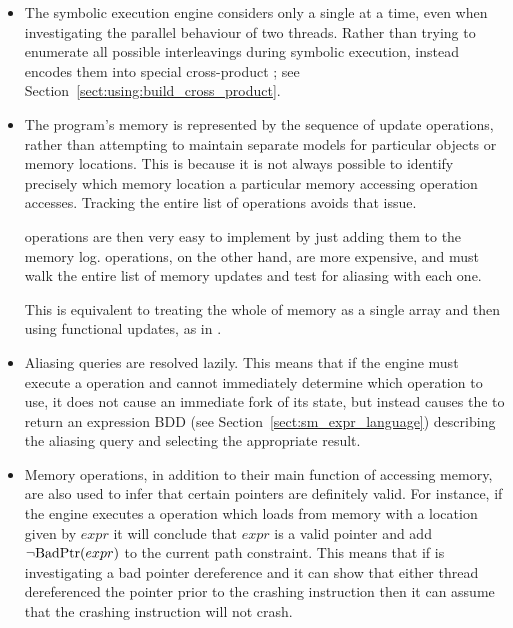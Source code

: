 \begin{itemize}
\item The symbolic execution engine considers only a single
  {\StateMachine} at a time, even when investigating the parallel
  behaviour of two threads.  Rather than trying to enumerate all
  possible interleavings during symbolic execution, {\technique}
  instead encodes them into special cross-product {\StateMachines};
  see Section~\ref{sect:using:build_cross_product}.

\item The program's memory is represented by the sequence of update
  operations, rather than attempting to maintain separate models for
  particular objects or memory locations.  This is because it is not
  always possible to identify precisely which memory location a
  particular memory accessing operation accesses.  Tracking the entire
  list of operations avoids that issue.

   operations are then very easy to implement by just
  adding them to the memory log.   operations, on the
  other hand, are more expensive, and must walk the entire list of
  memory updates and test for aliasing with each one.

  This is equivalent to treating the whole of memory as a single array
  and then using functional updates, as in \needCite{}.  


\item Aliasing queries are resolved lazily.  This means that if the
  engine must execute a  operation and cannot immediately
  determine which  operation to use, it does not cause an
  immediate fork of its state, but instead causes the  to
  return an expression BDD (see Section~\ref{sect:sm_expr_language})
  describing the aliasing query and selecting the appropriate result.
    

\item Memory operations, in addition to their main function of
  accessing memory, are also used to infer that certain pointers are
  definitely valid.  For instance, if the engine executes a
   operation which loads from memory with a location given
  by $\mathit{expr}$ it will conclude that $\mathit{expr}$ is a valid
  pointer and add ${\neg}\mathrm{BadPtr}(expr)$ to the current path
  constraint.  This means that if {\technique} is investigating a bad
  pointer dereference and it can show that either thread dereferenced
  the pointer prior to the crashing instruction then it can assume
  that the crashing instruction will not crash.


\end{itemize}

